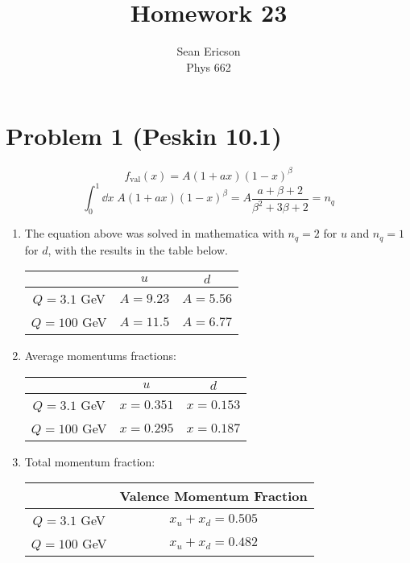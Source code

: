 \documentclass[12pt]{article}
\begin{document}
\title{Homework 23}
\author{Sean Ericson \\ Phys 662}
\maketitle

\section*{Problem 1 (Peskin 10.1)}
\[ f_\text{val}(x) = A(1 + ax)(1 - x)^\beta \]
\[ \int_0^1\dd x\; A(1 + ax)(1 - x)^\beta = A\frac{a + \beta + 2}{\beta^2 + 3\beta + 2} = n_q \]
\begin{enumerate}[label=(\alph*)]
    \item The equation above was solved in mathematica with $n_q = 2$ for $u$ and $n_q = 1$ for $d$, with the results in the table below.
    \begin{table}[h]
        \centering
        \begin{tabular}{c c c}
            & $u$ & $d$ \\
            \hline
            $Q = 3.1$ GeV & $A = 9.23$ & $A = 5.56$ \\
            $Q = 100$ GeV & $A = 11.5$ & $A = 6.77$ \\
        \end{tabular}
    \end{table}

    \item Average momentums fractions:
    \begin{table}[h]
        \centering
        \begin{tabular}{c c c}
            & $u$ & $d$ \\
            \hline
            $Q = 3.1$ GeV & $x = 0.351$ & $x = 0.153$ \\
            $Q = 100$ GeV & $x = 0.295$ & $x = 0.187$ \\
        \end{tabular}
    \end{table}

    \item Total momentum fraction:
    \begin{table}[h]
        \centering
        \begin{tabular}{c c}
            & Valence Momentum Fraction \\
            \hline
            $Q = 3.1$ GeV & $x_u + x_d = 0.505$ \\
            $Q = 100$ GeV & $x_u + x_d = 0.482$ \\
        \end{tabular}
    \end{table}
\end{enumerate}
\end{document}
